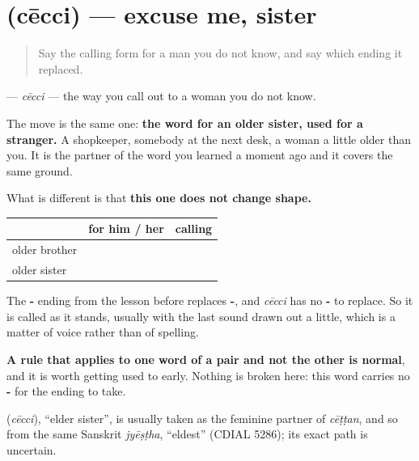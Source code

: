 \section[\texorpdfstring{\ml{ചേച്ചി} (cēcci)}{ചേച്ചി (cēcci)}]{ (cēcci) — excuse me, sister}

\label{lesson:ML-C82-chechi-address}



\begin{quote}
Say the calling form for a man you do not know, and say which ending it replaced.
\end{quote}

\begin{grammarlens}[title={Grammar Lens: the ending that has nothing to change}]
\textbf{} — \emph{cēcci} — the way you call out to a woman you do not know.

The move is the same one: \textbf{the word for an older sister, used for a stranger.} A shopkeeper, somebody at the next desk, a woman a little older than you. It is the partner of the word you learned a moment ago and it covers the same ground.

What is different is that \textbf{this one does not change shape.}

\noindent
\begin{tabularx}{\linewidth}{@{}>{\raggedright\arraybackslash}X>{\raggedright\arraybackslash}X>{\raggedright\arraybackslash}X@{}}
\toprule
\textbf{} & \textbf{for him / her} & \textbf{calling} \\
\midrule
older brother & \textbf{\ml{ചേട്ടൻ}} & \textbf{\ml{ചേട്ടാ}} \\
older sister & \textbf{\ml{ചേച്ചി}} & \textbf{\ml{ചേച്ചി}} \\
\bottomrule
\end{tabularx}

The \textbf{-} ending from the lesson before replaces \textbf{-}, and \emph{cēcci} has no \textbf{-} to replace. So it is called as it stands, usually with the last sound drawn out a little, which is a matter of voice rather than of spelling.

\textbf{A rule that applies to one word of a pair and not the other is normal}, and it is worth getting used to early. Nothing is broken here: this word carries no \textbf{-} for the ending to take.
\end{grammarlens}

\begin{cousinweb}
\textbf{} (\emph{cēcci}), \textquotedblleft{}elder sister\textquotedblright{}, is usually taken as the feminine partner of \emph{cēṭṭan}, and so from the same Sanskrit \emph{jyēṣṭha}, \textquotedblleft{}eldest\textquotedblright{} (CDIAL 5286); its exact path is uncertain.
\end{cousinweb}

